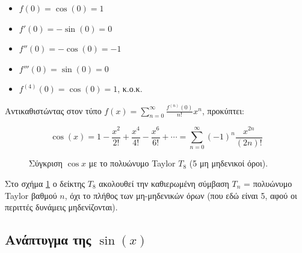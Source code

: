 \begin{itemize}
\tightlist
\item
  \(f(0) = \cos(0) = 1\)
\item
  \(f'(0) = -\sin(0) = 0\)
\item
  \(f''(0) = -\cos(0) = -1\)
\item
  \(f'''(0) = \sin(0) = 0\)
\item
  \(f^{(4)}(0) = \cos(0) = 1\), κ.ο.κ.
\end{itemize}

Αντικαθιστώντας στον τύπο
\(f(x)=\sum_{n=0}^{\infty} \frac{f^{(n)}(0)}{n!}x^n\), προκύπτει:

\[
\cos(x) = 1 - \frac{x^2}{2!} + \frac{x^4}{4!} - \frac{x^6}{6!} + \cdots = \sum_{n=0}^{\infty} (-1)^n \frac{x^{2n}}{(2n)!}
\]

\begin{figure}[htbp]
\centering
{}
\caption{Σύγκριση $\cos x$ με το πολυώνυμο Taylor $T_8$ (5 μη μηδενικοί όροι).}
\label{fig:costaylor5}
\end{figure}

Στο σχήμα \ref{fig:costaylor5} ο δείκτης $T_8$ ακολουθεί την καθιερωμένη
σύμβαση $T_n$ = πολυώνυμο Taylor βαθμού $n$, όχι το πλήθος των
μη-μηδενικών όρων (που εδώ είναι 5, αφού οι περιττές δυνάμεις
μηδενίζονται).

\subsection{\texorpdfstring{Ανάπτυγμα της
\(\sin(x)\)}{Ανάπτυγμα της \textbackslash sin(x)}}\label{ux3b1ux3bdux3acux3c0ux3c4ux3c5ux3b3ux3bcux3b1-ux3c4ux3b7ux3c2-sinx}

